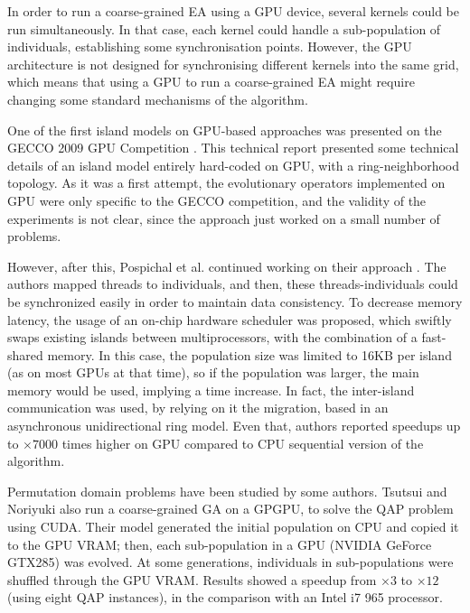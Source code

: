 \documentclass{article}
\begin{document}
In order to run a coarse-grained EA using a GPU device, several kernels could be run simultaneously. In that case, each kernel could handle a sub-population of individuals, establishing some synchronisation points.
However, the GPU architecture is not designed for synchronising
different kernels into the same grid, which means that using a GPU to
run a coarse-grained EA might require changing some standard mechanisms
of the algorithm. 


One of the first island models on GPU-based approaches was presented on the GECCO 2009 GPU Competition \cite{gecco2009CompetitionPospichal}. This technical report presented some technical details of an island model entirely hard-coded on GPU, with a ring-neighborhood topology. As it was a first attempt, the evolutionary operators implemented on GPU were only specific to the GECCO competition, and the validity of the experiments is not clear, since the approach just worked on a small number of problems.

However, after this, Pospichal et al. continued working on their approach \cite{pospichalParallelGeneticAlgorithOnCUDA2010,9253}. The authors mapped threads to individuals, and then, these threads-individuals could be synchronized easily in order to maintain data consistency. To decrease memory latency, the usage of an on-chip hardware scheduler was proposed, which swiftly swaps existing islands between multiprocessors, with the combination of a fast-shared memory. In this case, the population size was limited to 16KB per island (as on most GPUs at that time), so if the population was larger, the main memory would be used, implying a time increase. In fact, the inter-island communication was used, by relying on it the migration, based in an asynchronous unidirectional ring model. Even that, authors reported speedups up to $\times7000$ times higher on GPU compared to CPU sequential version of the algorithm.

Permutation domain problems have been studied by some authors. Tsutsui and Noriyuki \cite{1570355} also run a coarse-grained GA on a GPGPU, to solve the QAP problem using CUDA. Their model generated the initial population on CPU and copied it to the GPU VRAM; then, each sub-population in a GPU (NVIDIA GeForce GTX285) was evolved. At some generations, individuals in sub-populations were shuffled through the GPU VRAM. Results showed a speedup from $\times3$ to $\times12$ (using eight QAP instances), in the comparison with an Intel i7 965 processor. 
\end{document}
